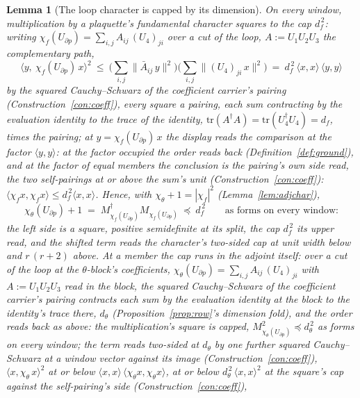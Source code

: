 \documentclass[11pt]{article}
\newtheorem{lemma}{Lemma}
\theoremstyle{definition}
\begin{document}
\begin{lemma}[The loop character is capped by its dimension]\label{lem:loopcap}
On every window, multiplication by a plaquette's fundamental character
squares to the cap $d_f^{\,2}$: writing
$\chi_f(U_{\partial p})=\sum_{i,j}A_{ij}\,(U_4)_{ji}$ over a
cut of the loop, $A:=U_1U_2U_3$ the complementary path,
\[
\big\langle y,\ \chi_f(U_{\partial p})\,x\big\rangle^{2}
\ \le\ \Big(\sum_{i,j}\|\bar A_{ij}\,y\|^2\Big)
\Big(\sum_{i,j}\|(U_4)_{ji}\,x\|^2\Big)
\ =\ d_f^{\,2}\,\langle x,x\rangle\,\langle y,y\rangle
\]
by the squared Cauchy--Schwarz of the coefficient carrier's pairing
(Construction~\ref{con:coeff}), every square a pairing, each sum
contracting by the evaluation identity to the trace of the identity,
$\mathrm{tr}(A^\dagger A)=\mathrm{tr}(U_4^\dagger U_4)=d_f$, times the
pairing; at $y=\chi_f(U_{\partial p})\,x$ the display reads the
comparison at the factor $\langle y,y\rangle$: at the factor
occupied the order reads back (Definition~\ref{def:ground}), and at
the factor of equal members the conclusion is the pairing's own
side read, the two self-pairings at or above the sum's unit
(Construction~\ref{con:coeff}):
$\langle\chi_f x,\chi_f x\rangle\le d_f^{\,2}\langle x,x\rangle$. Hence,
with $\chi_\theta+1=|\chi_f|^2$ (Lemma~\ref{lem:adjchar}),
\[
\chi_\theta(U_{\partial p})+1\;=\;M_{\chi_f(U_{\partial p})}^\dagger
M_{\chi_f(U_{\partial p})}\ \preceq\ d_f^{\,2}
\qquad\text{as forms on every window:}
\]
the left side is a square, positive semidefinite at its split, the cap
$d_f^{\,2}$ its upper read, and the shifted term reads the character's
two-sided cap at unit width below and $r\,(r+2)$ above. At a
member the cap runs in the adjoint itself: over a cut of the
loop at the $\theta$-block's coefficients,
$\chi_\theta(U_{\partial p})=\sum_{i,j}A_{ij}\,(U_4)_{ji}$ with
$A:=U_1U_2U_3$ read in the block, the squared Cauchy--Schwarz of
the coefficient carrier's pairing contracts each sum by the
evaluation identity at the block to the identity's trace there,
$d_\theta$ (Proposition~\ref{prop:row}'s dimension fold), and
the order reads back as above: the multiplication's square is
capped, $M_{\chi_\theta(U_{\partial p})}^{2}\preceq
d_\theta^{\,2}$ as forms on every window; the term reads two-sided
at $d_\theta$ by one further squared Cauchy--Schwarz at a window
vector against its image (Construction~\ref{con:coeff}),
$\langle x,\chi_\theta\,x\rangle^{2}$ at or below
$\langle x,x\rangle\,\langle\chi_\theta x,\chi_\theta x\rangle$, at
or below $d_\theta^{\,2}\,\langle x,x\rangle^{2}$ at the square's
cap against the self-pairing's side (Construction~\ref{con:coeff}),

\end{lemma}
\end{document}
